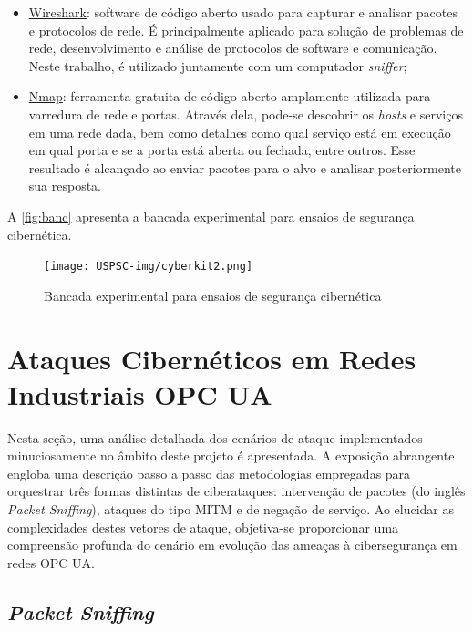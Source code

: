 \begin{itemize}
        \item \underline{Wireshark}: software de código aberto usado para capturar e analisar pacotes e protocolos de rede. É principalmente aplicado para solução de problemas de rede, desenvolvimento e análise de protocolos de software e comunicação. Neste trabalho, é utilizado juntamente com um computador \textit{sniffer};
        \item \underline{Nmap}: ferramenta gratuita de código aberto amplamente utilizada para varredura de rede e portas. Através dela, pode-se descobrir os \textit{hosts} e serviços em uma rede dada, bem como detalhes como qual serviço está em execução em qual porta e se a porta está aberta ou fechada, entre outros. Esse resultado é alcançado ao enviar pacotes para o alvo e analisar posteriormente sua resposta.
    \end{itemize}

    A \autoref{fig:banc} apresenta a bancada experimental para ensaios de segurança cibernética.
    
    \begin{figure}[htbp]
        \caption{\label{fig:banc}Bancada experimental para ensaios de segurança cibernética}
        \begin{center}
            \texttt{[image: USPSC-img/cyberkit2.png]}
        \end{center}
    \end{figure}

\section{Ataques Cibernéticos em Redes Industriais OPC UA} \label{sec:attacks}

    Nesta seção, uma análise detalhada dos cenários de ataque implementados minuciosamente no âmbito deste projeto é apresentada. A exposição abrangente engloba uma descrição passo a passo das metodologias empregadas para orquestrar três formas distintas de ciberataques: intervenção de pacotes (do inglês \textit{Packet Sniffing}), ataques do tipo MITM e de negação de serviço. Ao elucidar as complexidades destes vetores de ataque, objetiva-se proporcionar uma compreensão profunda do cenário em evolução das ameaças à cibersegurança em redes OPC UA.

    \subsection{\textit{Packet Sniffing}}

